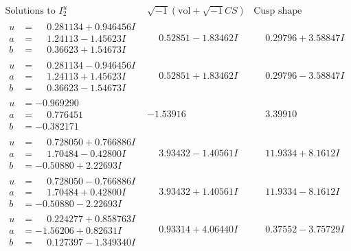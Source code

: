 \documentclass[1p]{elsarticle_modified}
\theoremstyle{definition}
\newcommand{\I}{\sqrt{-1}}
\begin{document}
$$\begin{array}{c|c|c}  
\text{Solutions to }I^u_{2}& \I (\text{vol} + \sqrt{-1}CS) & \text{Cusp shape}\\
 \hline 
\begin{aligned}
u &= \phantom{-}0.281134 + 0.946456 I \\
a &= \phantom{-}1.24113 - 1.45623 I \\
b &= \phantom{-}0.36623 + 1.54673 I\end{aligned}
 & \phantom{-}0.52851 - 1.83462 I & \phantom{-}0.29796 + 3.58847 I \\ \hline\begin{aligned}
u &= \phantom{-}0.281134 - 0.946456 I \\
a &= \phantom{-}1.24113 + 1.45623 I \\
b &= \phantom{-}0.36623 - 1.54673 I\end{aligned}
 & \phantom{-}0.52851 + 1.83462 I & \phantom{-}0.29796 - 3.58847 I \\ \hline\begin{aligned}
u &= -0.969290\phantom{ +0.000000I} \\
a &= \phantom{-}0.776451\phantom{ +0.000000I} \\
b &= -0.382171\phantom{ +0.000000I}\end{aligned}
 & -1.53916\phantom{ +0.000000I} & \phantom{-}3.39910\phantom{ +0.000000I} \\ \hline\begin{aligned}
u &= \phantom{-}0.728050 + 0.766886 I \\
a &= \phantom{-}1.70484 - 0.42800 I \\
b &= -0.50880 + 2.22693 I\end{aligned}
 & \phantom{-}3.93432 - 1.40561 I & \phantom{-}11.9334 + 8.1612 I \\ \hline\begin{aligned}
u &= \phantom{-}0.728050 - 0.766886 I \\
a &= \phantom{-}1.70484 + 0.42800 I \\
b &= -0.50880 - 2.22693 I\end{aligned}
 & \phantom{-}3.93432 + 1.40561 I & \phantom{-}11.9334 - 8.1612 I \\ \hline\begin{aligned}
u &= \phantom{-}0.224277 + 0.858763 I \\
a &= -1.56206 + 0.82631 I \\
b &= \phantom{-}0.127397 - 1.349340 I\end{aligned}
 & \phantom{-}0.93314 + 4.06440 I & \phantom{-}0.37552 - 3.75729 I \\ \hline\begin{aligned}

\end{aligned}
\end{array}$$
\end{document}
